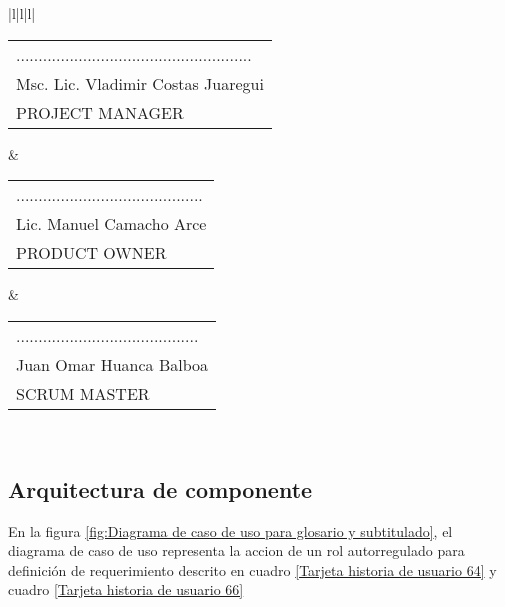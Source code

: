 \begin{minipage}[!htb]{\hsize}
\begin{tabular}{|l|l|l|}
 \\ \hline\begin{tabular}[c]{@{}l@{}}.....................................................\\ Msc. Lic. Vladimir Costas Juaregui\\ PROJECT MANAGER\end{tabular} & \begin{tabular}[c]{@{}l@{}}..........................................\\ Lic. Manuel Camacho Arce\\ PRODUCT OWNER\end{tabular} & \begin{tabular}[c]{@{}l@{}}.........................................\\ Juan Omar Huanca Balboa\\ SCRUM MASTER\end{tabular} \\ \hline
\end{tabular}
\label{Tarjeta historia de usuario 66}
\end{minipage}

\subsection{Arquitectura de componente}

En la figura \ref{fig:Diagrama de caso de uso para glosario y subtitulado},
el diagrama de caso de uso representa la accion de un rol autorregulado
para definición de requerimiento descrito en cuadro
\ref{Tarjeta historia de usuario 64} y cuadro
\ref{Tarjeta historia de usuario 66}

\begin{minipage}{1.0\textwidth}
	\centering
	\label{fig:Diagrama de caso de uso para glosario y subtitulado}
\end{minipage}

